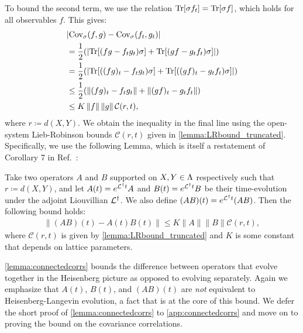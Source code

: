 To bound the second term, we use the relation $\mathrm{Tr}[\sigma f_t]=\mathrm{Tr}[\sigma f]$, which holds for all observables $f$.
This gives:
\begin{align}
& |\text{Cov}_\sigma(f, g)  - \text{Cov}_\sigma(f_t, g_t)| \\
& = \frac12 (|\mathrm{Tr}[(fg-f_tg_t)\sigma] + \mathrm{Tr}[(gf-g_tf_t)\sigma]|) \\
& = \frac12 (|\mathrm{Tr}[((fg)_t-f_tg_t)\sigma] + \mathrm{Tr}[((gf)_t-g_tf_t)\sigma]|) \\
& \leq \frac12 (\|(fg)_t-f_tg_t\|+\|(gf)_t -g_tf_t\|) \\
& \le K \left\|f\right\|  \left\|g\right\| \mathcal{C}(r, t), \label{eq:secondterm}
\end{align}
where $r \coloneqq d(X,Y)$.  We obtain the inequality in the final line using the open-system Lieb-Robinson bounds $\mathcal C(r,t)$ given in \cref{lemma:LRbound_truncated}.
Specifically, we use the following Lemma, which is itself a restatement of Corollary 7 in Ref.~\cite{Kastoryano2013}:
\begin{lemma}
  \label{lemma:connectedcorrs}
    Take two operators $A$ and $B$ supported on $X,Y \in \Lambda$  respectively such that $r\coloneqq d(X,Y)$, and let $A(t)=e^{\mathcal{L}^\dag t}A$ and $B(t) = e^{\mathcal{L}^\dag t}B$ be their time-evolution under the adjoint Liouvillian $\mathcal{L}^\dag$.
    We also define $(AB)(t) = e^{\mathcal{L}^\dag t}(AB)$.
    Then the following bound holds:
    \begin{align}
    \label{eq:ops-evolving-together}
        \|(AB)(t) - A(t)B(t)\| \le K\|A\|\|B\|\mathcal C(r,t),
    \end{align}
    where $\mathcal C(r,t)$ is given by \cref{lemma:LRbound_truncated} and $K$ is some constant that depends on lattice parameters.
\end{lemma}
\cref{lemma:connectedcorrs} bounds the difference between operators that evolve together in the Heisenberg picture as opposed to evolving separately.
Again we emphasize that $A(t)$, $B(t)$, and $(AB)(t)$ are \textit{not} equivalent to Heisenberg-Langevin evolution, a fact that is at the core of this bound.
We defer the short proof of \cref{lemma:connectedcorrs} to \cref{app:connectedcorrs} and move on to proving the bound on the covariance correlations.

